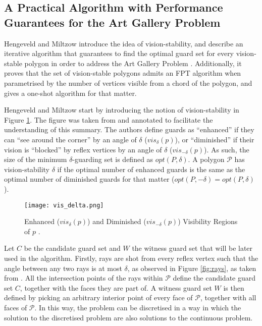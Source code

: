 \subsection{A Practical Algorithm with Performance Guarantees for the Art Gallery Problem \cite{DBLP:journals/corr/abs-2007-06920}}
Hengeveld and Miltzow \cite{DBLP:journals/corr/abs-2007-06920} introduce the idea of vision-stability, and describe an iterative algorithm that guarantees to find the optimal guard set for every vision-stable polygon in order to address the Art Gallery Problem \cite{o1987art}. Additionally, it proves that the set of vision-stable polygons admits an FPT algorithm when parametrised by the number of vertices visible from a chord of the polygon, and gives a one-shot algorithm for that matter.

Hengeveld and Miltzow \cite{DBLP:journals/corr/abs-2007-06920} start by introducing the notion of vision-stability in Figure \ref{fig:vis}. The figure was taken from \cite{DBLP:journals/corr/abs-2007-06920} and annotated to facilitate the understanding of this summary. The authors define guards as ``enhanced'' if they can ``see around the corner'' by an angle of $\delta$ ($vis_\delta(p)$), or ``diminished'' if their vision is ``blocked'' by reflex vertices by an angle of $\delta$ ($vis_{-\delta}(p)$). As such, the size of the minimum $\delta$-guarding set is defined as $opt(P, \delta)$. A polygon $\mathcal P$ has vision-stability $\delta$ if the optimal number of enhanced guards is the same as the optimal number of diminished guards for that matter ($opt(P, -\delta) = opt(P, \delta)$). 

\begin{figure}[h!]
    \centering
    \texttt{[image: vis\_delta.png]}
    \caption{Enhanced ($vis_\delta(p)$) and Diminished ($vis_{-\delta}(p)$) Visibility Regions of $p$ \cite{DBLP:journals/corr/abs-2007-06920}.}
    \label{fig:vis}
\end{figure}

Let $C$ be the candidate guard set and $W$ the witness guard set that will be later used in the algorithm. Firstly, rays are shot from every reflex vertex such that the angle between any two rays is at most $\delta$, as observed in Figure \ref{fig:rays}, as taken from \cite{DBLP:journals/corr/abs-2007-06920}. All the intersection points of the rays within $\mathcal P$ define the candidate guard set $C$, together with the faces they are part of. A witness guard set $W$ is then defined by picking an arbitrary interior point of every face of $\mathcal P$, together with all faces of $\mathcal P$. In this way, the problem can be discretised in a way in which the solution to the discretised problem are also solutions to the continuous problem.

